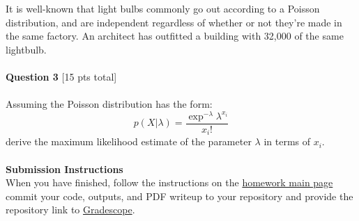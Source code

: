 \documentclass[paper=a4, fontsize=11pt]{scrartcl} %
\begin{document}
It is well-known that light bulbs commonly go out according to a Poisson distribution, and are independent regardless of whether or not they're made in the same factory. An architect has outfitted a building with 32,000 of the same lightbulb. \\
\\
{\Large \textbf{Question 3} [15 pts total]} \\
\\
Assuming the Poisson distribution has the form:
\begin{equation}
p(X | \lambda) = \frac{ \exp^{-\lambda} \lambda ^{x_i}}{ x_i !}
\end{equation}
derive the maximum likelihood estimate of the parameter $\lambda$ in terms of $x_i$. \\
\\


{\huge \textbf{Submission Instructions}} \\

When you have finished, follow the instructions on the \href{https://course.ccs.neu.edu/cs6220/homework-3/}{ homework main page} commit your code, outputs, and PDF writeup to your repository and provide the repository link to \href{https://www.gradescope.com}{Gradescope}.
\end{document}
